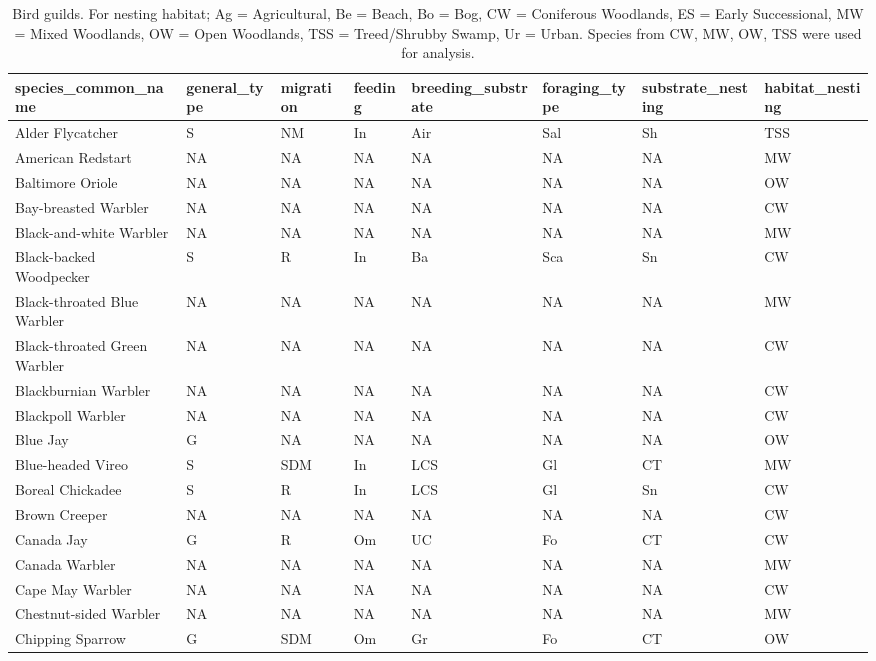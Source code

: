 \documentclass[
  letterpaper,
  DIV=11,
  numbers=noendperiod,
  oneside]{scrartcl}
\begin{document}
\hypertarget{tbl-bird-guilds}{}
\begin{table}
\caption{\label{tbl-bird-guilds}Bird guilds. For nesting habitat; Ag = Agricultural, Be = Beach, Bo =
Bog, CW = Coniferous Woodlands, ES = Early Successional, MW = Mixed
Woodlands, OW = Open Woodlands, TSS = Treed/Shrubby Swamp, Ur = Urban.
Species from CW, MW, OW, TSS were used for analysis. }\tabularnewline

\centering
\begin{tabular}{l|l|l|l|l|l|l|l}
\hline
species\_common\_name & general\_type & migration & feeding & breeding\_substrate & foraging\_type & substrate\_nesting & habitat\_nesting\\
\hline
Alder Flycatcher & S & NM & In & Air & Sal & Sh & TSS\\
\hline
American Redstart & NA & NA & NA & NA & NA & NA & MW\\
\hline
Baltimore Oriole & NA & NA & NA & NA & NA & NA & OW\\
\hline
Bay-breasted Warbler & NA & NA & NA & NA & NA & NA & CW\\
\hline
Black-and-white Warbler & NA & NA & NA & NA & NA & NA & MW\\
\hline
Black-backed Woodpecker & S & R & In & Ba & Sca & Sn & CW\\
\hline
Black-throated Blue Warbler & NA & NA & NA & NA & NA & NA & MW\\
\hline
Black-throated Green Warbler & NA & NA & NA & NA & NA & NA & CW\\
\hline
Blackburnian Warbler & NA & NA & NA & NA & NA & NA & CW\\
\hline
Blackpoll Warbler & NA & NA & NA & NA & NA & NA & CW\\
\hline
Blue Jay & G & NA & NA & NA & NA & NA & OW\\
\hline
Blue-headed Vireo & S & SDM & In & LCS & Gl & CT & MW\\
\hline
Boreal Chickadee & S & R & In & LCS & Gl & Sn & CW\\
\hline
Brown Creeper & NA & NA & NA & NA & NA & NA & CW\\
\hline
Canada Jay & G & R & Om & UC & Fo & CT & CW\\
\hline
Canada Warbler & NA & NA & NA & NA & NA & NA & MW\\
\hline
Cape May Warbler & NA & NA & NA & NA & NA & NA & CW\\
\hline
Chestnut-sided Warbler & NA & NA & NA & NA & NA & NA & MW\\
\hline
Chipping Sparrow & G & SDM & Om & Gr & Fo & CT & OW\\

\end{tabular}
\end{table}
\end{document}
